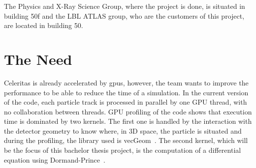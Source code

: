 The Physics and X-Ray Science Group, where the project is done, is situated in building 50f and the LBL ATLAS group, who are the customers of this project, are located in building 50.


\section{The Need}
\label{spec:ch:context:need}

Celeritas is already accelerated by \acrshort{gpu}s, however, the team wants to improve the performance to be able to reduce the time of a simulation.
In the current version of the code, each particle track is processed in parallel by one GPU thread, with no collaboration between threads.
GPU profiling of the code shows that execution time is dominated by two kernels.
The first one is handled by the interaction with the detector geometry to know where, in 3D space, the particle is situated and during the profiling, the library used is vecGeom~\cite{VecGeom}.
The second kernel, which will be the focus of this bachelor thesis project, is the computation of a differential equation using Dormand-Prince~\cite{princeDormand}.
